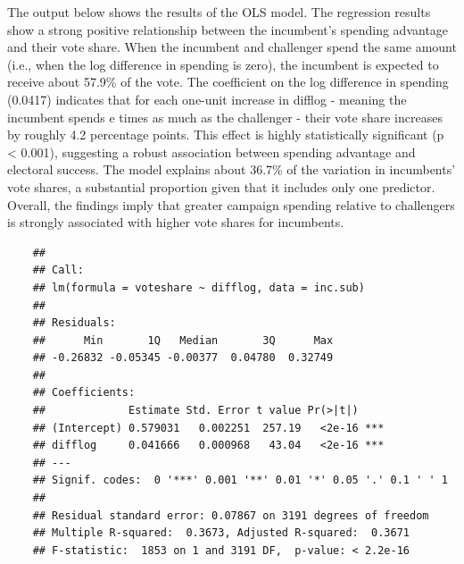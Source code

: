 \documentclass[
]{article}
\begin{document}
The output below shows the results of the OLS model. The regression results show a strong positive relationship between the incumbent’s spending advantage and their vote share. When the incumbent and challenger spend the same amount (i.e., when the log difference in spending is zero), the incumbent is expected to receive about 57.9\% of the vote. The coefficient on the log difference in spending (0.0417) indicates that for each one-unit increase in difflog - meaning the incumbent spends e times as much as the challenger - their vote share increases by roughly 4.2 percentage points. This effect is highly statistically significant (p < 0.001), suggesting a robust association between spending advantage and electoral success. The model explains about 36.7\% of the variation in incumbents’ vote shares, a substantial proportion given that it includes only one predictor. Overall, the findings imply that greater campaign spending relative to challengers is strongly associated with higher vote shares for incumbents. \newpage

\begin{verbatim}
	## 
	## Call:
	## lm(formula = voteshare ~ difflog, data = inc.sub)
	## 
	## Residuals:
	##      Min       1Q   Median       3Q      Max 
	## -0.26832 -0.05345 -0.00377  0.04780  0.32749 
	## 
	## Coefficients:
	##             Estimate Std. Error t value Pr(>|t|)    
	## (Intercept) 0.579031   0.002251  257.19   <2e-16 ***
	## difflog     0.041666   0.000968   43.04   <2e-16 ***
	## ---
	## Signif. codes:  0 '***' 0.001 '**' 0.01 '*' 0.05 '.' 0.1 ' ' 1
	## 
	## Residual standard error: 0.07867 on 3191 degrees of freedom
	## Multiple R-squared:  0.3673, Adjusted R-squared:  0.3671 
	## F-statistic:  1853 on 1 and 3191 DF,  p-value: < 2.2e-16
\end{verbatim}
\vspace{.5cm}
\end{document}
